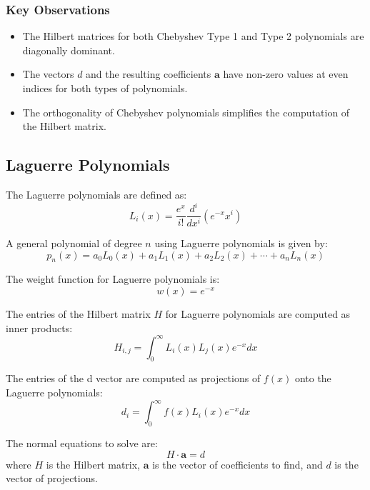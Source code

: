 \documentclass[10pt]{article}
\begin{document}
\subsubsection{Key Observations}
\begin{itemize}
    \item The Hilbert matrices for both Chebyshev Type 1 and Type 2 polynomials are diagonally dominant.
    \item The vectors \( d \) and the resulting coefficients \( \mathbf{a} \) have non-zero values at even indices for both types of polynomials.
    \item The orthogonality of Chebyshev polynomials simplifies the computation of the Hilbert matrix.
\end{itemize}

\subsection{Laguerre Polynomials}

The Laguerre polynomials are defined as:
\begin{equation}
L_i(x) = \frac{e^x}{i!} \frac{d^i}{dx^i} \left( e^{-x} x^i \right)
\end{equation}

A general polynomial of degree $ n $ using Laguerre polynomials is given by:
\begin{equation}
p_n(x) = a_0 L_0(x) + a_1 L_1(x) + a_2 L_2(x) + \cdots + a_n L_n(x)
\end{equation}

The weight function for Laguerre polynomials is:
\begin{equation}
w(x) = e^{-x}
\end{equation}

The entries of the Hilbert matrix \( H \) for Laguerre polynomials are computed as inner products:
\begin{equation}
H_{i,j} = \int_{0}^{\infty} L_i(x) L_j(x) e^{-x} dx
\end{equation}

The entries of the d vector are computed as projections of \( f(x) \) onto the Laguerre polynomials:
\begin{equation}
d_i = \int_{0}^{\infty} f(x) L_i(x) e^{-x} dx
\end{equation}

The normal equations to solve are:
\begin{equation}
H \cdot \mathbf{a} = d
\end{equation}
where \( H \) is the Hilbert matrix, \( \mathbf{a} \) is the vector of coefficients to find, and \( d \) is the vector of projections.
\end{document}
